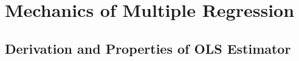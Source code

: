 \documentclass[xcolor=svgnames,9pt,english,aspectratio=169,t]{beamer}
\begin{document}





\section{Mechanics of Multiple Regression}


\subsection{Derivation and Properties of OLS Estimator}
\end{document}
